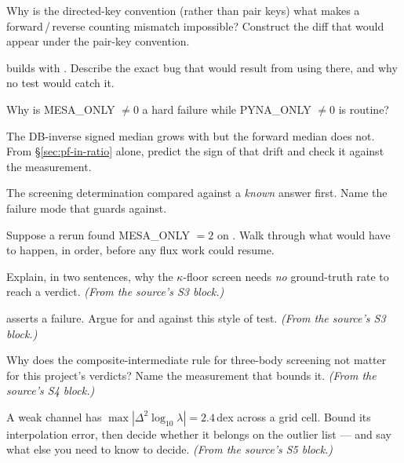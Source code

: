 \begin{selfcheck}
\item Why is the directed-key convention (rather than pair keys) what makes a
      forward\,/\,reverse counting mismatch impossible? Construct the diff that
      would appear under the pair-key convention.
\item {} builds with . Describe the
      exact bug that would result from using  there,
      and why no test would catch it.
\item Why is MESA\_ONLY $\ne 0$ a hard failure while PYNA\_ONLY $\ne 0$ is
      routine?
\item The DB-inverse signed median grows with \Tn{} but the forward median does
      not. From \S\ref{sec:pf-in-ratio} alone, predict the sign of that drift and
      check it against the measurement.
\item The screening determination compared against a \emph{known} answer first.
      Name the failure mode that guards against.
\item Suppose a rerun found MESA\_ONLY $= 2$ on . Walk through what
      would have to happen, in order, before any flux work could resume.
\item Explain, in two sentences, why the $\kappa$-floor screen needs \emph{no}
      ground-truth rate to reach a verdict.
      \emph{(From the source's S3 block.)}
\item {} asserts a failure. Argue for and
      against this style of test. \emph{(From the source's S3 block.)}
\item Why does the composite-intermediate rule for three-body screening not
      matter for this project's verdicts? Name the measurement that bounds it.
      \emph{(From the source's S4 block.)}
\item A weak channel has $\max|\Delta^2\log_{10}\lambda| = 2.4$\,dex across a
      grid cell. Bound its interpolation error, then decide whether it belongs
      on the outlier list --- and say what else you need to know to decide.
      \emph{(From the source's S5 block.)}
\end{selfcheck}
